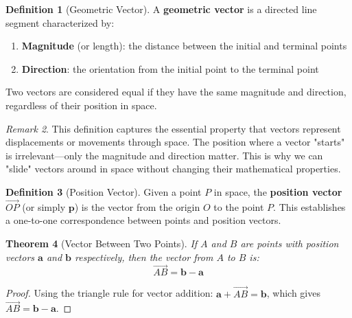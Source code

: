 \documentclass[12pt]{article}
\numberwithin{equation}{section}
\newcommand{\vect}[1]{\boldsymbol{#1}}   %
\theoremstyle{plain}
\newtheorem{theorem}{Theorem}[section]
\theoremstyle{definition}
\newtheorem{definition}[theorem]{Definition}
\theoremstyle{remark}
\newtheorem{remark}[theorem]{Remark}
\begin{document}
\begin{definition}[Geometric Vector]
A \textbf{geometric vector} is a directed line segment characterized by:
\begin{enumerate}
\item \textbf{Magnitude} (or length): the distance between the initial and terminal points
\item \textbf{Direction}: the orientation from the initial point to the terminal point
\end{enumerate}
Two vectors are considered equal if they have the same magnitude and direction, regardless of their position in space.
\end{definition}

\begin{remark}
This definition captures the essential property that vectors represent displacements or movements through space. The position where a vector "starts" is irrelevant—only the magnitude and direction matter. This is why we can "slide" vectors around in space without changing their mathematical properties.
\end{remark}

\begin{definition}[Position Vector]
Given a point $P$ in space, the \textbf{position vector} $\overrightarrow{OP}$ (or simply $\vect{p}$) is the vector from the origin $O$ to the point $P$. This establishes a one-to-one correspondence between points and position vectors.
\end{definition}

\begin{theorem}[Vector Between Two Points]
If $A$ and $B$ are points with position vectors $\vect{a}$ and $\vect{b}$ respectively, then the vector from $A$ to $B$ is:
$$\overrightarrow{AB} = \vect{b} - \vect{a}$$
\end{theorem}

\begin{proof}
Using the triangle rule for vector addition: $\vect{a} + \overrightarrow{AB} = \vect{b}$, which gives $\overrightarrow{AB} = \vect{b} - \vect{a}$.
\end{proof}
\end{document}

